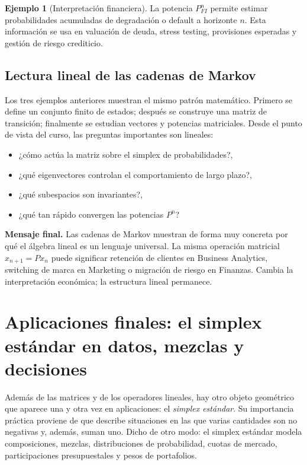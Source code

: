 \documentclass[10pt,a4paper,oneside]{article}
\theoremstyle{plain}
\theoremstyle{definition}
\newtheorem{example}[theorem]{Ejemplo}
\theoremstyle{remark}
\begin{document}
\begin{example}[Interpretación financiera]
La potencia \(P_{FI}^n\) permite estimar probabilidades acumuladas de degradación o default a horizonte \(n\). Esta información se usa en valuación de deuda, stress testing, provisiones esperadas y gestión de riesgo crediticio.
\end{example}

\subsection{Lectura lineal de las cadenas de Markov}

Los tres ejemplos anteriores muestran el mismo patrón matemático. Primero se define un conjunto finito de estados; después se construye una matriz de transición; finalmente se estudian vectores y potencias matriciales. Desde el punto de vista del curso, las preguntas importantes son lineales:
\begin{itemize}
\item ¿cómo actúa la matriz sobre el simplex de probabilidades?,
\item ¿qué eigenvectores controlan el comportamiento de largo plazo?,
\item ¿qué subespacios son invariantes?,
\item ¿qué tan rápido convergen las potencias \(P^n\)?
\end{itemize}

\begin{summaryBox}
\textbf{Mensaje final.} Las cadenas de Markov muestran de forma muy concreta por qué el álgebra lineal es un lenguaje universal. La misma operación matricial \(x_{n+1}=Px_n\) puede significar retención de clientes en Business Analytics, switching de marca en Marketing o migración de riesgo en Finanzas. Cambia la interpretación económica; la estructura lineal permanece.
\end{summaryBox}


\section{Aplicaciones finales: el simplex estándar en datos, mezclas y decisiones}

Además de las matrices y de los operadores lineales, hay otro objeto geométrico que aparece una y otra vez en aplicaciones: el \emph{simplex estándar}. Su importancia práctica proviene de que describe situaciones en las que varias cantidades son no negativas y, además, suman uno. Dicho de otro modo: el simplex estándar modela composiciones, mezclas, distribuciones de probabilidad, cuotas de mercado, participaciones presupuestales y pesos de portafolios.
\end{document}
